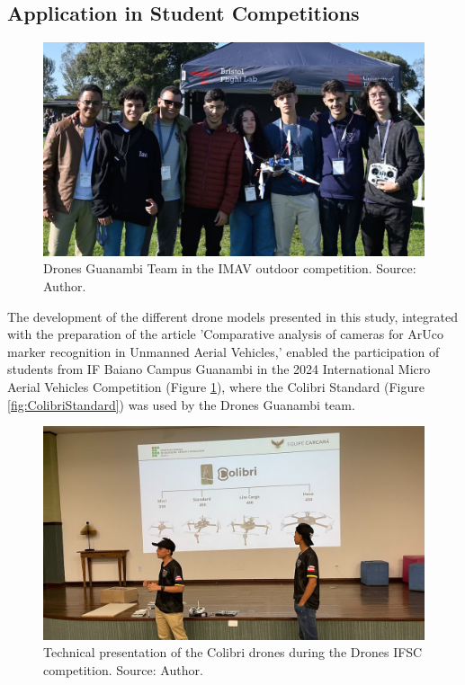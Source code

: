\documentclass[conference]{IEEEtran}
\begin{document}
\subsection{Application in Student Competitions}

\begin{figure}[!htb]
    \centering
    \includegraphics[scale=0.30]{img/imav2024.png} 
    \caption{Drones Guanambi Team in the IMAV outdoor competition. Source: Author.}
    \label{fig:imav}
\end{figure}

The development of the different drone models presented in this study, integrated with the preparation of the article 'Comparative analysis of cameras for ArUco marker recognition in Unmanned Aerial Vehicles,' enabled the participation of students from IF Baiano Campus Guanambi in the 2024 International Micro Aerial Vehicles Competition (Figure \ref{fig:imav}), where the Colibri Standard (Figure \ref{fig:ColibriStandard}) was used by the Drones Guanambi team.

\begin{figure}[!htb]
    \centering
    \includegraphics[scale=0.30]{img/ifsc.png} 
    \caption{Technical presentation of the Colibri drones during the Drones IFSC competition. Source: Author.}
    \label{fig:ifsc}
\end{figure}
\end{document}
